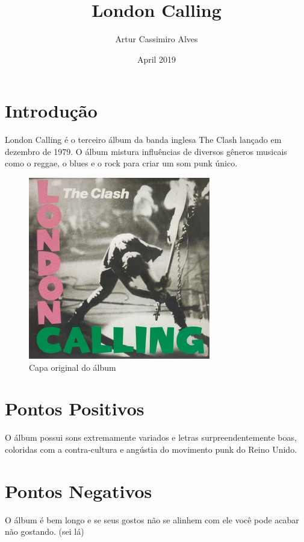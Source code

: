 \documentclass{article}
\title{London Calling}
\author{Artur Cassimiro Alves}
\date{April 2019}
\begin{document}
\maketitle

\section{Introdução}
London Calling é o terceiro álbum da banda inglesa The Clash lançado em dezembro de 1979. O álbum mistura influências de diversos gêneros musicais como o reggae, o blues e o rock para criar um som punk único.
\cite{wikipediaLondonCalling}

\begin{figure}[h!]
\centering
\includegraphics[scale=1.0]{LondonCalling}
\caption{Capa original do álbum}
\label{fig:London Calling}
\end{figure}

\section{Pontos Positivos}
O álbum possui sons extremamente variados e letras surpreendentemente boas, coloridas com a contra-cultura e angústia do movimento punk do Reino Unido.

\section{Pontos Negativos}
O álbum é bem longo e se seus gostos não se alinhem com ele você pode acabar não gostando. (sei lá)
\end{document}
